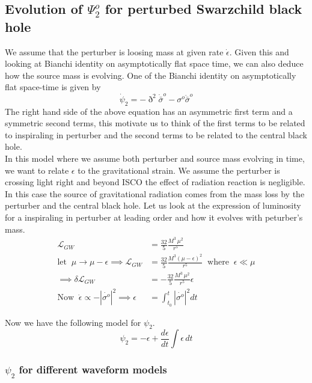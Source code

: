 \documentclass[prd,preprintnumbers,onecolumn,eqsecnum,floatfix,letter]{revtex4}
\begin{document}
\subsection{Evolution of $\Psi^{o}_{2}$ for perturbed Swarzchild black hole }
We assume that the perturber is loosing mass at given rate $\dot{\epsilon}$. Given this and looking at Bianchi identity on asymptotically flat space time, we can also deduce how the source mass is evolving. One of the Bianchi identity on asymptotically flat space-time is given by 
\begin{equation}
		\dot{\psi}_2 = - \eth^{2}\dot{\bar{\sigma}}^{o} - {\sigma}^{o}\ddot{\bar{\sigma}}^{o}
\end{equation}
The right hand side of the above equation has an asymmetric first term and a symmetric second terms, this motivate us to think of the first terms to be related to inspiraling in perturber and the second terms to be related to the central black hole.\\    
 In this model where we assume both perturber and source mass evolving in time, we want to relate $\epsilon$ to the gravitational strain. We assume the perturber is crossing light right and beyond ISCO the effect of radiation reaction is negligible. In this case the source of gravitational radiation comes from the mass loss by the perturber and the central black hole. Let us look at the expression of luminosity for a inspiraling in perturber at leading order and how it evolves with peturber's mass.
 \begin{align}
 \mathcal{L}_{GW} & = \frac{32}{5}\frac{M^3\,\mu^2}{r^5}\nonumber\\
 \text{let} \;\; \mu \rightarrow \mu - \epsilon \implies \mathcal{L}_{GW} &= \frac{32}{5}\frac{M^3\left(\mu-\epsilon\right)^2}{r^5} \; \; \text{where} \;\; \epsilon \ll \mu\\
 \implies \delta\mathcal{L}_{GW} & = - \frac{32}{5}\frac{M^3\,\mu^2}{r^5}\epsilon\nonumber\\
 \text{Now} \;\; \dot{\epsilon} \propto -|\dot{\sigma^{o}}|^{2} \implies \epsilon &= \int_{t_0}^{t}|\dot{\sigma^{o}}|^{2}dt
 \label{LuminosityMasslossRelation}
 \end{align}         
 
 Now we have the following model for $\psi_{2}$.
 \begin{equation}
 	\psi_{2} = -\epsilon + \frac{d\epsilon}{dt}\int\epsilon\,dt
 	\label{psi2Model}
 \end{equation}


\subsubsection{$\psi_{2}$ \; for different waveform models }
\end{document}
